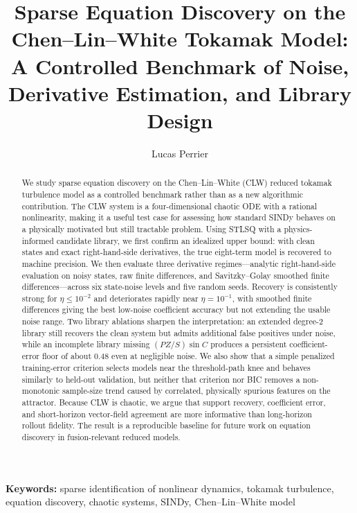 \documentclass[12pt]{article}
\begin{document}
\title{Sparse Equation Discovery on the Chen--Lin--White Tokamak Model: \\
A Controlled Benchmark of Noise, Derivative Estimation, and Library Design}

\author{Lucas Perrier}
\date{}

\maketitle

\begin{abstract}
We study sparse equation discovery on the Chen--Lin--White (CLW) reduced tokamak turbulence model as a controlled benchmark rather than as a new algorithmic contribution.
The CLW system is a four-dimensional chaotic ODE with a rational nonlinearity, making it a useful test case for assessing how standard SINDy behaves on a physically motivated but still tractable problem.
Using STLSQ with a physics-informed candidate library, we first confirm an idealized upper bound: with clean states and exact right-hand-side derivatives, the true eight-term model is recovered to machine precision.
We then evaluate three derivative regimes---analytic right-hand-side evaluation on noisy states, raw finite differences, and Savitzky--Golay smoothed finite differences---across six state-noise levels and five random seeds.
Recovery is consistently strong for $\eta \le 10^{-2}$ and deteriorates rapidly near $\eta = 10^{-1}$, with smoothed finite differences giving the best low-noise coefficient accuracy but not extending the usable noise range.
Two library ablations sharpen the interpretation: an extended degree-2 library still recovers the clean system but admits additional false positives under noise, while an incomplete library missing $(PZ/S)\sin C$ produces a persistent coefficient-error floor of about $0.48$ even at negligible noise.
We also show that a simple penalized training-error criterion selects models near the threshold-path knee and behaves similarly to held-out validation, but neither that criterion nor BIC removes a non-monotonic sample-size trend caused by correlated, physically spurious features on the attractor.
Because CLW is chaotic, we argue that support recovery, coefficient error, and short-horizon vector-field agreement are more informative than long-horizon rollout fidelity.
The result is a reproducible baseline for future work on equation discovery in fusion-relevant reduced models.
\end{abstract}

\noindent\textbf{Keywords:} sparse identification of nonlinear dynamics, tokamak turbulence, equation discovery, chaotic systems, SINDy, Chen--Lin--White model
\end{document}
